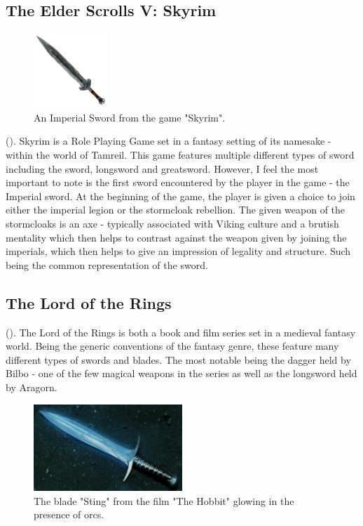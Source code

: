 \documentclass{article}
\begin{document}
\subsection{The Elder Scrolls V: Skyrim}
\begin{figure}
    \centering
    \includegraphics[width=0.25\textwidth]{ImperialSword.png}
    \caption{\parencite{imperialSword} An Imperial Sword from the game "Skyrim".
    }
    \label{fig:ImperialSword}
\end{figure}
().
Skyrim is a Role Playing Game set in a fantasy setting of its namesake - within the world of Tamreil. This game features multiple different types of sword including the sword, longsword and greatsword. However, I feel the most important to note is the first sword encountered by the player in the game - the Imperial sword. At the beginning of the game, the player is given a choice to join either the imperial legion or the stormcloak rebellion. The given weapon of the stormcloaks is an axe - typically associated with Viking culture and a brutish mentality which then helps to contrast against the weapon given by joining the imperials, which then helps to give an impression of legality and structure. Such being the common representation of the sword.

\subsection{The Lord of the Rings} \label{lotr}

().
The Lord of the Rings is both a book and film series set in a medieval fantasy world. Being the generic conventions of the fantasy genre, these feature many different types of swords and blades. The most notable being the dagger held by Bilbo - one of the few magical weapons in the series as well as the longsword held by Aragorn.

\begin{figure}[h]
    \centering
    \caption{\parencite{Sting} The blade "Sting" from the film "The Hobbit" glowing in the presence of orcs.}
    \label{fig:Sting}
    \includegraphics[width=0.5\textwidth]{Sting.png}
\end{figure}
\end{document}
